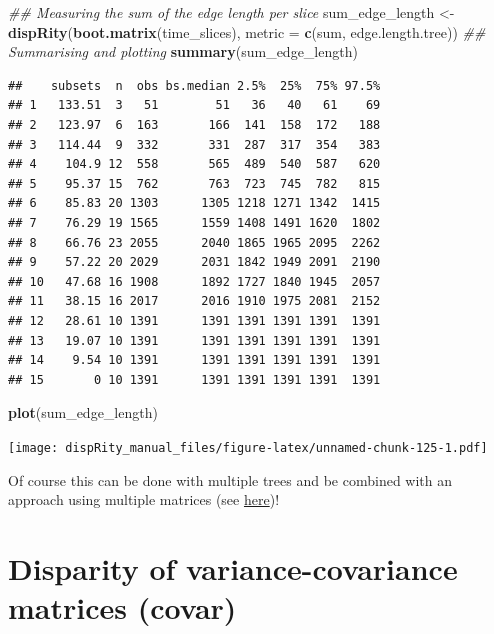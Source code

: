 \documentclass[
]{book}
\newenvironment{Shaded}{\begin{snugshade}}{\end{snugshade}}
\newcommand{\CommentTok}[1]{\textcolor[rgb]{0.56,0.35,0.01}{\textit{#1}}}
\newcommand{\DataTypeTok}[1]{\textcolor[rgb]{0.13,0.29,0.53}{#1}}
\newcommand{\KeywordTok}[1]{\textcolor[rgb]{0.13,0.29,0.53}{\textbf{#1}}}
\newcommand{\NormalTok}[1]{#1}
\newcommand{\StringTok}[1]{\textcolor[rgb]{0.31,0.60,0.02}{#1}}
\begin{document}
\begin{Shaded}
\begin{Highlighting}[]
\CommentTok{\#\# Measuring the sum of the edge length per slice}
\NormalTok{sum\_edge\_length \textless{}{-}}\StringTok{ }\KeywordTok{dispRity}\NormalTok{(}\KeywordTok{boot.matrix}\NormalTok{(time\_slices), }\DataTypeTok{metric =} \KeywordTok{c}\NormalTok{(sum, edge.length.tree))}
\CommentTok{\#\# Summarising and plotting}
\KeywordTok{summary}\NormalTok{(sum\_edge\_length)}
\end{Highlighting}
\end{Shaded}

\begin{verbatim}
##    subsets  n  obs bs.median 2.5%  25%  75% 97.5%
## 1   133.51  3   51        51   36   40   61    69
## 2   123.97  6  163       166  141  158  172   188
## 3   114.44  9  332       331  287  317  354   383
## 4    104.9 12  558       565  489  540  587   620
## 5    95.37 15  762       763  723  745  782   815
## 6    85.83 20 1303      1305 1218 1271 1342  1415
## 7    76.29 19 1565      1559 1408 1491 1620  1802
## 8    66.76 23 2055      2040 1865 1965 2095  2262
## 9    57.22 20 2029      2031 1842 1949 2091  2190
## 10   47.68 16 1908      1892 1727 1840 1945  2057
## 11   38.15 16 2017      2016 1910 1975 2081  2152
## 12   28.61 10 1391      1391 1391 1391 1391  1391
## 13   19.07 10 1391      1391 1391 1391 1391  1391
## 14    9.54 10 1391      1391 1391 1391 1391  1391
## 15       0 10 1391      1391 1391 1391 1391  1391
\end{verbatim}

\begin{Shaded}
\begin{Highlighting}[]
\KeywordTok{plot}\NormalTok{(sum\_edge\_length)}
\end{Highlighting}
\end{Shaded}

\texttt{[image: dispRity\_manual\_files/figure-latex/unnamed-chunk-125-1.pdf]}

Of course this can be done with multiple trees and be combined with an approach using multiple matrices (see \protect\hyperlink{multi.input}{here})!

\hypertarget{covar}{%
\section{Disparity of variance-covariance matrices (covar)}\label{covar}}
\end{document}
